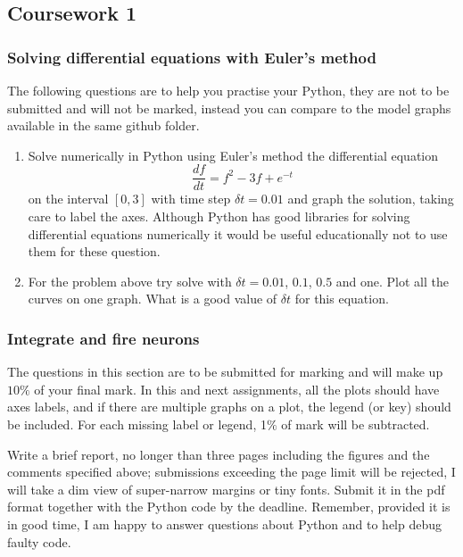 \documentclass[11pt,a4paper]{scrartcl}
\begin{document}
\subsection*{Coursework 1}

\subsubsection*{Solving differential equations with Euler's method}

The following questions are to help you practise your Python, they are
not to be submitted and will not be marked, instead you can compare to
the model graphs available in the same github folder.

\begin{enumerate}

\item Solve numerically in Python using Euler's method the differential equation
\begin{equation}
\frac{df}{dt}=f^2-3f+e^{-t}
\end{equation}
on the interval $[0,3]$ with time step $\delta t=0.01$ and graph the
solution, taking care to label the axes. Although Python has good
libraries for solving differential equations numerically it would be
useful educationally not to use them for these question.

\item For the problem above try solve with $\delta t=0.01$, $0.1$,
  $0.5$ and one. Plot all the curves on one graph. What is a good
  value of $\delta t$ for this equation.

\end{enumerate}

\subsubsection*{Integrate and fire neurons}

The questions in this section are to be submitted for marking and will
make up $10\%$ of your final mark. In this and next assignments, all
the plots should have axes labels, and if there are multiple graphs on
a plot, the legend (or key) should be included. For each missing label
or legend, 1$\%$ of mark will be subtracted.

Write a brief report, no longer than three pages including the figures
and the comments specified above; submissions exceeding the page limit
will be rejected, I will take a dim view of super-narrow margins or
tiny fonts. Submit it in the pdf format together with the Python code
by the deadline. Remember, provided it is in good time, I am happy to
answer questions about Python and to help debug faulty code.
\end{document}
